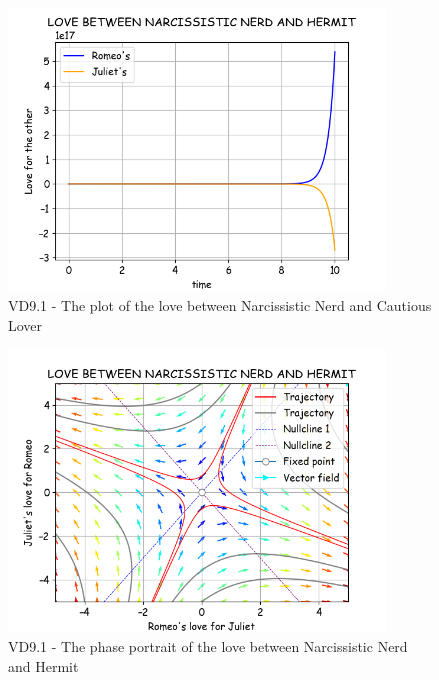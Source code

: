 \pagebreak
\begin{figure}[!htbp]
    \centering
    \includegraphics[width=100mm]{image/bt2/plot9.1.png}
    \caption{VD9.1 - The plot of the love between Narcissistic Nerd and Cautious Lover}
\end{figure}
\begin{figure}[!htbp]
    \centering
    \includegraphics[width=100mm]{image/bt2/pp9.1.png}
    \caption{VD9.1 - The phase portrait of the love between Narcissistic Nerd and Hermit}
\end{figure}


